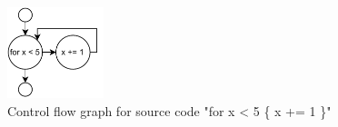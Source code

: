 \begin{figure}[htp!]
    \centering
    \includegraphics[width=0.25\textwidth]{assets/figures/chapter2/cfg.pdf}
    \caption{Control flow graph for source code "for x < 5 \{ x += 1 \}"}
    \label{fig:cfg}
\end{figure}
